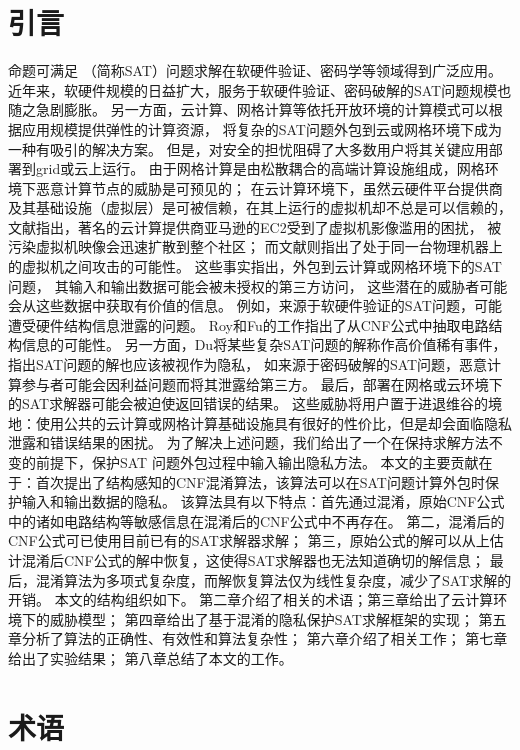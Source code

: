 \section{引言}
命题可满足\cite{SATtheory} （简称SAT）问题求解在软硬件验证\cite{HardwareSAT,softwareSAT}、密码学\cite{cryptoSAT}等领域得到广泛应用。
近年来，软硬件规模的日益扩大，服务于软硬件验证、密码破解的SAT问题规模也随之急剧膨胀。
另一方面，云计算、网格计算等依托开放环境的计算模式可以根据应用规模提供弹性的计算资源，
将复杂的SAT问题外包到云或网格环境下成为一种有吸引的解决方案\cite{Nordugrid,CloudSMT,OneSpin}。
但是，对安全的担忧阻碍了大多数用户将其关键应用部署到grid或云上运行。
由于网格计算是由松散耦合的高端计算设施组成\cite{Nordugrid}，网格环境下恶意计算节点的威胁是可预见的\cite{HV-grid}；
在云计算环境下，虽然云硬件平台提供商及其基础设施（虚拟层）是可被信赖，在其上运行的虚拟机却不总是可以信赖的，
文献\cite{AMI}指出，著名的云计算提供商亚马逊的EC2受到了虚拟机影像滥用的困扰，
被污染虚拟机映像会迅速扩散到整个社区；
而文献\cite{InformationLeakageofCloud}则指出了处于同一台物理机器上的虚拟机之间攻击的可能性。
这些事实指出，外包到云计算或网格环境下的SAT问题，
其输入和输出数据可能会被未授权的第三方访问，
这些潜在的威胁者可能会从这些数据中获取有价值的信息。
例如，来源于软硬件验证的SAT问题，可能遭受硬件结构信息泄露的问题。
Roy\cite{csRoy}和Fu\cite{csFu}的工作指出了从CNF公式中抽取电路结构信息的可能性。
另一方面，Du\cite{HV-grid}将某些复杂SAT问题的解称作高价值稀有事件，指出SAT问题的解也应该被视作为隐私，
如来源于密码破解的SAT问题，恶意计算参与者可能会因利益问题而将其泄露给第三方。
最后，部署在网格或云环境下的SAT求解器可能会被迫使返回错误的结果。
这些威胁将用户置于进退维谷的境地：使用公共的云计算或网格计算基础设施具有很好的性价比，但是却会面临隐私泄露和错误结果的困扰。
为了解决上述问题，我们给出了一个在保持求解方法不变的前提下，保护SAT 问题外包过程中输入输出隐私方法。
本文的主要贡献在于：首次提出了结构感知的CNF混淆算法，该算法可以在SAT问题计算外包时保护输入和输出数据的隐私。
该算法具有以下特点：首先通过混淆，原始CNF公式中的诸如电路结构等敏感信息在混淆后的CNF公式中不再存在。
第二，混淆后的CNF公式可已使用目前已有的SAT求解器求解；
第三，原始公式的解可以从上估计混淆后CNF公式的解中恢复，这使得SAT求解器也无法知道确切的解信息；
最后，混淆算法为多项式复杂度，而解恢复算法仅为线性复杂度，减少了SAT求解的开销。
本文的结构组织如下。
第二章介绍了相关的术语；第三章给出了云计算环境下的威胁模型；
第四章给出了基于混淆的隐私保护SAT求解框架的实现；
第五章分析了算法的正确性、有效性和算法复杂性；
第六章介绍了相关工作；
第七章给出了实验结果；
第八章总结了本文的工作。
\section{术语}

